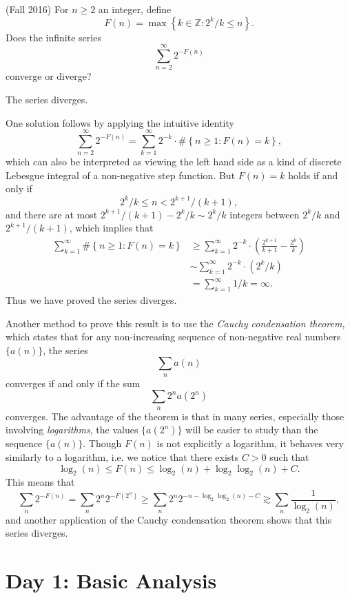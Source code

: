 \documentclass[answers]{exam}
\theoremstyle{problemstyle}
\newcommand{\1}[1]{\textbf{1}_{\left[#1\right]}} %
\def\Z{\mathbb{Z}} %
\begin{document}
\begin{questions}

\question (Fall 2016)
  For $n \geq 2$ an integer, define
  \[ F(n)= \max \left\{ k\in \Z: 2^{k}/k\leq n \right\}. \]
  Does the infinite series
  \[ \sum_{n=2}^{\infty}2^{-F(n)} \]
  converge or diverge?
\begin{solution}
	The series diverges.

	One solution follows by applying the intuitive identity
	\[ \sum_{n = 2}^\infty 2^{-F(n)} = \sum_{k = 1}^\infty 2^{-k} \cdot \# \left\{ n \geq 1 : F(n) = k \right\}, \]
	which can also be interpreted as viewing the left hand side as a kind of discrete Lebesgue integral of a non-negative step function. But $F(n) = k$ holds if and only if
	\[ 2^k/k \leq n < 2^{k+1} / (k+1), \]
	and there are at most $2^{k+1} / (k+1) - 2^k / k \sim 2^k / k$ integers between $2^k / k$ and $2^{k+1} / (k+1)$, which implies that
	\begin{align*}
		\sum_{k = 1}^\infty \# \left\{ n \geq 1: F(n) = k \right\} &\geq \sum_{k=1}^{\infty} 2^{-k} \cdot \left( \frac{2^{k+1}}{k+1}-\frac{2^{k}}{k} \right)\\
    &\sim \sum_{k=1}^{\infty} 2^{-k} \cdot (2^k / k)\\
    &=\sum_{k=1}^{\infty} 1/k = \infty.
  \end{align*}
  Thus we have proved the series diverges.

  Another method to prove this result is to use the \emph{Cauchy condensation theorem}, which states that for any non-increasing sequence of non-negative real numbers $\{ a(n) \}$, the series
	\[ \sum_n a(n) \]
	converges if and only if the sum
	\[ \sum_n 2^n a(2^n) \]
	converges. The advantage of the theorem is that in many series, especially those involving \emph{logarithms}, the values $\{ a(2^n) \}$ will be easier to study than the sequence $\{ a(n) \}$. Though $F(n)$ is not explicitly a logarithm, it behaves very similarly to a logarithm, i.e. we notice that there exists $C > 0$ such that
	\[ \log_2(n) \leq F(n) \leq \log_2(n) + \log_2 \log_2(n) + C. \]
	This means that
	\[ \sum_n 2^{-F(n)} = \sum_n 2^n 2^{-F(2^n)} \geq \sum_n 2^n 2^{- n - \log_2 \log_2(n) - C } \gtrsim \sum_n \frac{1}{\log_2(n)}, \]
	and another application of the Cauchy condensation theorem shows that this series diverges.
\end{solution}

\newpage

\section{Day 1: Basic Analysis}


\end{questions}
\end{document}
